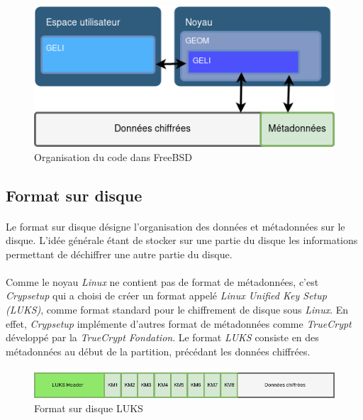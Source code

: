 \paragraph{}
\begin{figure}[h]
\centering
\includegraphics[width=.8\linewidth]{etat_art/organisation_FreeBSD.png}
\caption{\label{fig:OrgFreeBSD}Organisation du code dans FreeBSD}
\end{figure}

\subsection{Format sur disque}
\paragraph{}
Le format sur disque désigne l'organisation des données et métadonnées sur le 
disque. L'idée générale étant de stocker sur une partie du disque les 
informations permettant de déchiffrer une autre partie du disque.
\paragraph{}
Comme le noyau {\em Linux} ne contient pas de format de métadonnées, 
c'est {\em Crypsetup} qui a choisi de créer un format appelé {\em Linux 
Unified Key Setup ({\em LUKS})}, comme format standard pour le chiffrement de 
disque sous {\em Linux}. En effet, {\em Crypsetup} implémente d'autres format 
de métadonnées comme {\em TrueCrypt} développé par la 
{\em TrueCrypt Fondation}. 
Le format {\em LUKS} consiste en des métadonnées au début de la partition, 
précédant les données chiffrées.

\paragraph{}
\begin{figure}[h]
\centering
\includegraphics[width=.8\linewidth]{etat_art/format_disque_luks.png}
\caption{\label{fig:LUKSFormat}Format sur disque LUKS}
\end{figure}

